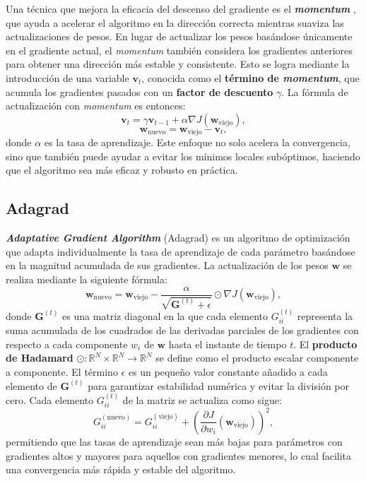 Una técnica que mejora la eficacia del descenso del gradiente es el \textbf{\textit{momentum}}
\cite{rumelhart1986learning}, que ayuda a acelerar el algoritmo en la dirección correcta
mientras suaviza las actualizaciones de pesos. En lugar de actualizar los pesos
basándose únicamente en el gradiente actual, el \textit{momentum} también
considera los gradientes anteriores para obtener una dirección más estable y
consistente. Esto se logra mediante la introducción de una variable $\mathbf{v}_{t}$,
conocida como el \textbf{término de \textit{momentum}}, que acumula los
gradientes pasados con un \textbf{factor de descuento} $\gamma$. La fórmula de
actualización con \textit{momentum} es entonces:
\begin{equation}
	\mathbf{v}_{t}= \gamma \mathbf{v}_{t-1}+ \alpha \nabla J(\mathbf{w}_{\text{viejo}}
	),
\end{equation}
\begin{equation}
	\mathbf{w}_{\text{nuevo}}= \mathbf{w}_{\text{viejo}}- \mathbf{v}_{t},
\end{equation}
donde $\alpha$ es la tasa de aprendizaje. Este enfoque no solo acelera la convergencia,
sino que también puede ayudar a evitar los mínimos locales subóptimos, haciendo que
el algoritmo sea más eficaz y robusto en práctica.

\subsection{Adagrad}

\textbf{\textit{Adaptative Gradient Algorithm}} (Adagrad) \cite{duchi2011adaptive}
es un algoritmo de optimización que adapta individualmente la tasa de aprendizaje
de cada parámetro basándose en la magnitud acumulada de sus gradientes. La
actualización de los pesos $\mathbf{w}$ se realiza mediante la siguiente fórmula:
\[
\mathbf{w}_{\text{nuevo}}= \mathbf{w}_{\text{viejo}}- \frac{\alpha}{\sqrt{\mathbf{G}^{(t)}+
		\epsilon}}\odot \nabla J(\mathbf{w}_{\text{viejo}}),
\]
donde $\mathbf{G}^{(t)}$ es una matriz diagonal en la que cada elemento $G_{ii}^{(t)}$
representa la suma acumulada de los cuadrados de las derivadas parciales de los gradientes
con respecto a cada componente $w_{i}$ de $\mathbf{w}$ hasta el instante de tiempo
$t$. El \textbf{producto de Hadamard} $\odot : \mathbb{R}^{N} \times \mathbb{R}^{N}
\to \mathbb{R}^{N}$ se define como el producto escalar componente a componente.
El término $\epsilon$ es un pequeño valor constante añadido a cada elemento de
$\mathbf{G}^{(t)}$ para garantizar estabilidad numérica y evitar la división por
cero. Cada elemento $G_{ii}^{(t)}$ de la matriz se actualiza como sigue:
\[
G_{ii}^{(\text{nuevo})}= G_{ii}^{(\text{viejo})}+ \left(\frac{\partial J}{\partial
	w_{i}}(\mathbf{w}_{\text{viejo}})\right)^{2},
\]
permitiendo que las tasas de aprendizaje sean más bajas para parámetros con
gradientes altos y mayores para aquellos con gradientes menores, lo cual facilita
una convergencia más rápida y estable del algoritmo.

